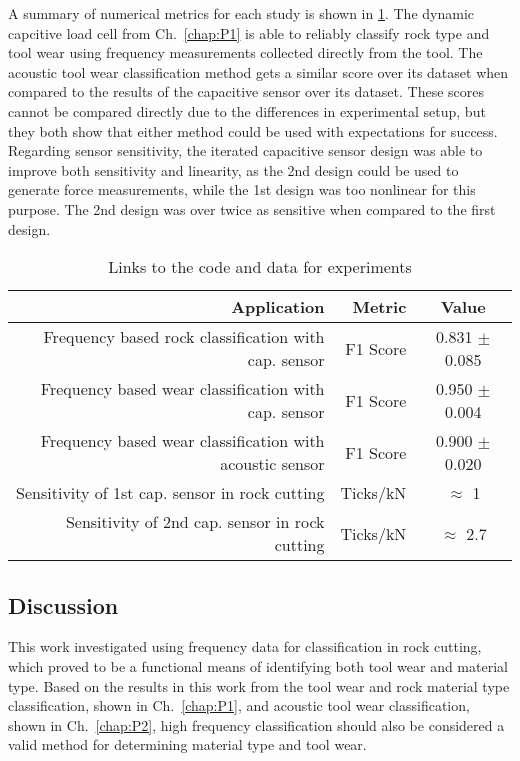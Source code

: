 A summary of numerical metrics for each study is shown in \ref{tab:results}.
The dynamic capcitive load cell from Ch.~\ref{chap:P1} is able to reliably classify 
rock type and tool wear using frequency measurements collected directly from the tool.
The acoustic tool wear classification method gets a similar score over its dataset 
when compared to the results of the capacitive sensor over its dataset.
These scores cannot be compared directly due to the differences in experimental setup, 
but they both show that either method could be used with expectations for success.
Regarding sensor sensitivity, the iterated capacitive sensor design was able 
to improve both sensitivity and linearity, as the 2nd design could be used
to generate force measurements, while the 1st design was too nonlinear for this purpose.
The 2nd design was over twice as sensitive when compared to the first design.



\begin{table}[]
\centering
\caption{Links to the code and data for experiments}
\label{tab:results}
\begin{tabular}{|r|r|c|}
\hline
Application                                                  & Metric & Value \\ \hline
Frequency based rock classification with cap. sensor & F1 Score & 0.831 $\pm$ 0.085 \\ \hline 
Frequency based wear classification with cap. sensor & F1 Score & 0.950 $\pm$ 0.004 \\ \hline
Frequency based wear classification with acoustic sensor& F1 Score & 0.900 $\pm$ 0.020 \\ \hline
Sensitivity of 1st cap. sensor in rock cutting & Ticks/kN &  $\approx$ 1 \\ \hline
Sensitivity of 2nd cap. sensor in rock cutting & Ticks/kN & $\approx$ 2.7\\ \hline
\end{tabular}
\end{table}


\subsection{Discussion}

This work investigated using frequency data for classification in rock cutting,
which proved to be a functional means of identifying both tool wear and material type.
Based on the results in this work from the tool wear and rock material type classification, shown in Ch.~\ref{chap:P1}, 
and acoustic tool wear classification, shown in Ch.~\ref{chap:P2}, high frequency classification 
should also be considered a valid method for determining material type and tool wear. 

